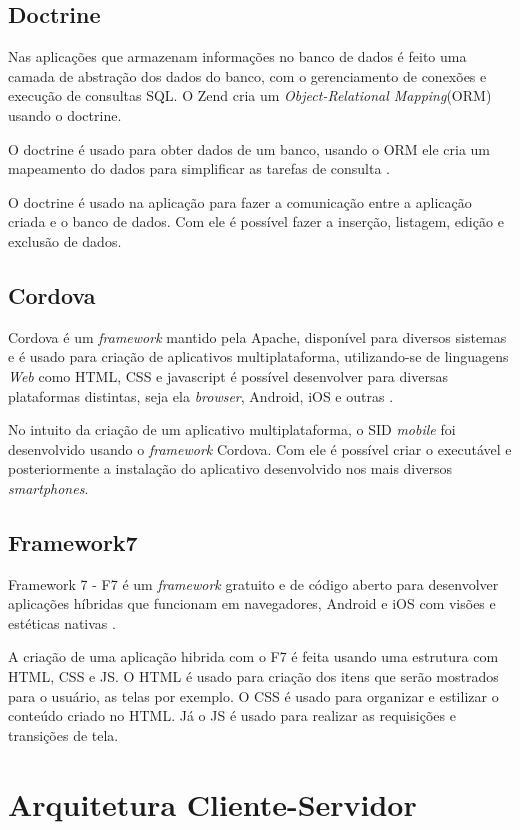 \subsection{Doctrine}
Nas aplicações que armazenam informações no banco de dados é feito uma camada de abstração dos dados do banco, com o gerenciamento de conexões e execução de consultas SQL. O Zend cria um \textit{Object-Relational Mapping}(ORM) usando o doctrine.

O doctrine é usado para obter dados de um banco, usando o ORM ele cria um mapeamento do dados para simplificar as tarefas de consulta \cite[p.102]{vaswani2010}.

O doctrine é usado na aplicação para fazer a comunicação entre a aplicação criada e o banco de dados. Com ele é possível fazer a inserção, listagem, edição e exclusão de dados.

\subsection{Cordova}
Cordova é um \textit{framework} mantido pela Apache, disponível para diversos sistemas e é usado para criação de aplicativos multiplataforma, utilizando-se de linguagens \textit{Web} como HTML, CSS e javascript é possível desenvolver para diversas plataformas distintas, seja ela \textit{browser}, Android, iOS e outras \cite{prezotto2017}.

No intuito da criação de um aplicativo multiplataforma, o SID \textit{mobile} foi desenvolvido usando o \textit{framework} Cordova. Com ele é possível criar o executável e posteriormente a instalação do aplicativo desenvolvido nos mais diversos \textit{smartphones}.

\subsection{Framework7}
Framework 7 - F7 é um \textit{framework} gratuito e de código aberto para desenvolver aplicações híbridas que funcionam em navegadores, Android e iOS com visões e estéticas nativas \cite{f72018}.

A criação de uma aplicação hibrida com o F7 é feita usando uma estrutura com HTML, CSS e JS. O HTML é usado para criação dos itens que serão mostrados para o usuário, as telas por exemplo. O CSS é usado para organizar e estilizar o conteúdo criado no HTML. Já o JS é usado para realizar as requisições e transições de tela.

\section{Arquitetura Cliente-Servidor}
